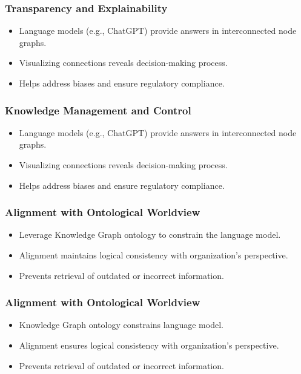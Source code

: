 \begin{frame}[fragile]\frametitle{Transparency and Explainability}

\begin{itemize}
\item Language models (e.g., ChatGPT) provide answers in interconnected node graphs.
\item Visualizing connections reveals decision-making process.
\item Helps address biases and ensure regulatory compliance.
\end{itemize}
	  
\end{frame}

\begin{frame}[fragile]\frametitle{Knowledge Management and Control}

\begin{itemize}
\item Language models (e.g., ChatGPT) provide answers in interconnected node graphs.
\item Visualizing connections reveals decision-making process.
\item Helps address biases and ensure regulatory compliance.
\end{itemize}
	  
\end{frame}

\begin{frame}[fragile]\frametitle{Alignment with Ontological Worldview}

\begin{itemize}
\item Leverage Knowledge Graph ontology to constrain the language model.
\item Alignment maintains logical consistency with organization's perspective.
\item Prevents retrieval of outdated or incorrect information.
\end{itemize}
	  
\end{frame}

\begin{frame}[fragile]\frametitle{Alignment with Ontological Worldview}
\begin{itemize}
\item Knowledge Graph ontology constrains language model.
\item Alignment ensures logical consistency with organization's perspective.
\item Prevents retrieval of outdated or incorrect information.
\end{itemize}
\end{frame}

